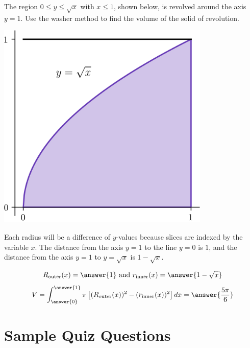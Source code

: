 \documentclass{ximera}
\begin{document}
\begin{exercise}
The region $0 \leq y \leq \sqrt{x}$ with $x \leq 1$, shown below, is revolved around the axis $y=1$. Use the washer method to find the volume of the solid of revolution.
\begin{center}
\begin{image}
\includegraphics[width=4in]{diskwasher/disk03.png}
\end{image}
\end{center}
\begin{hint}
Each radius will be a difference of $y$-values because slices are indexed by the variable $x$.
The distance from the axis $y=1$ to the line $y=0$ is $1$, and the distance from the axis $y=1$ to $y = \sqrt{x}$ is $1 - \sqrt{x}$.
\end{hint}
\begin{prompt}
\[ R_{\mathrm{outer}} (x) = \answer{1} \text{ and } r_{\mathrm{inner}}(x) = \answer{1-\sqrt{x}} \]
\[ V = \int_{\answer{0}}^{\answer{1}} \pi  \left[ (R_{\mathrm{outer}}(x))^2 - (r_{\mathrm{inner}}(x))^2 \right] dx =  \answer{\frac{5\pi}{6}} \]
\end{prompt}
\end{exercise}



\section*{Sample Quiz Questions}
\end{document}
